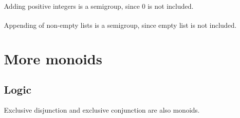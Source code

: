 \documentclass{article}
\begin{document}
    \paragraph{}
    Adding positive integers is a semigroup, since $0$ is not included.

    \paragraph{}
    Appending of non-empty lists is a semigroup, since empty list is not included.

    \section{More monoids}

    \subsection{Logic}

    Exclusive disjunction and exclusive conjunction are also monoids.
\end{document}
